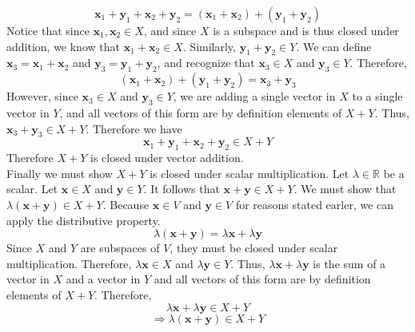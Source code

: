 \documentclass[12pt, letterpaper]{article}
\begin{document}
\begin{solution}
\[        \mathbf{x}_1 +\mathbf{y}_1 +\mathbf{x}_2 +\mathbf{y}_2 = \left( \mathbf{x}_1 +\mathbf{x}_2 \right) + \left( \mathbf{y}_1 +\mathbf{y}_2 \right)
    \]
    Notice that since \(\mathbf{x}_1,\mathbf{x}_2\in X\), and since \(X\) is a subspace and is thus closed under addition, we know that \(\mathbf{x}_1 +\mathbf{x}_2 \in X\). Similarly, \(\mathbf{y}_1 +\mathbf{y}_2 \in Y\). We can define \(\mathbf{x}_3 = \mathbf{x}_1 +\mathbf{x}_2\) and \(\mathbf{y}_3 =\mathbf{y}_1 +\mathbf{y}_2\), and recognize that \(\mathbf{x}_3 \in X\) and \(\mathbf{y}_3\in Y\). Therefore,
    \[
        \left( \mathbf{x}_1 +\mathbf{x}_2 \right) + \left( \mathbf{y}_1 +\mathbf{y}_2 \right) = \mathbf{x}_3 +\mathbf{y}_3
    \]
    However, since \(\mathbf{x}_3\in X\) and \(\mathbf{y}_3 \in Y\), we are adding a single vector in \(X\) to a single vector in \(Y\), and all vectors of this form are by definition elements of \(X+Y\). Thus, \(\mathbf{x}_3 +\mathbf{y}_3 \in X+Y\). Therefore we have 
    \[
        \mathbf{x}_1 +\mathbf{y}_1 +\mathbf{x}_2 +\mathbf{y}_2 \in X+Y
    \]
    Therefore \(X+Y\) is closed under vector addition.\\
    Finally we must show \(X+Y\) is closed under scalar multiplication. Let \(\lambda \in \mathbb{R}\) be a scalar. Let \(\mathbf{x}\in X\) and \(\mathbf{y}\in Y\). It follows that \(\mathbf{x}+\mathbf{y}\in X+Y\). We must show that \(\lambda \left( \mathbf{x}+\mathbf{y} \right)\in X+Y \). Because \(\mathbf{x}\in V\) and \(\mathbf{y}\in V\) for reasons stated earler, we can apply the distributive property. 
    \[
        \lambda \left( \mathbf{x}+\mathbf{y} \right) =\lambda \mathbf{x}+\lambda \mathbf{y}
    \]
    Since \(X\) and \(Y\) are subspaces of \(V\), they must be closed under scalar multiplication. Therefore, \(\lambda \mathbf{x}\in X\) and \(\lambda \mathbf{y}\in Y\). Thus, \(\lambda \mathbf{x}+\lambda \mathbf{y}\) is the sum of a vector in \(X\) and a vector in \(Y\) and all vectors of this form are by definition elements of \(X+Y\). Therefore,
    \[
        \lambda \mathbf{x}+\lambda \mathbf{y}\in X+Y
    \]
    \[
        \Longrightarrow \lambda \left( \mathbf{x}+\mathbf{y} \right)\in X+Y
    \]
\end{solution}
\end{document}
